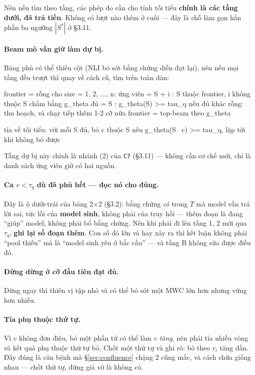 \documentclass[11pt,a4paper]{article}
\begin{document}
Nên nếu tìm theo tầng, các phép đo cần cho tính tối tiểu \textbf{chính là các tầng dưới, đã
trả tiền}. Không có lượt nào thêm ở cuối --- đây là chỗ làm gọn hẳn phần ba ngưỡng $|S^*|$ ở
\S3.11.

\paragraph{Beam mò vẫn giữ làm dự bị.} Bảng phủ có thể thiếu cột (NLI bỏ sót bằng chứng diễn
đạt lại), nên nếu mọi tầng đều trượt thì quay về cách cũ, tìm trên toàn dàn:

\begin{dia}
frontier = { rỗng }
cho size = 1, 2, ..., n:
    ứng viên = { S + {i} : S thuộc frontier, i không thuộc S }
    chấm bằng g_theta
    đủ = { S : g_theta(S) >= tau_q }
    nếu đủ khác rỗng:  thu hoạch, và chạy tiếp thêm 1-2 cỡ nữa
    frontier = top-beam theo g_theta

tỉa về tối tiểu:  với mỗi S đủ, bỏ c thuộc S nếu g_theta(S \ {c}) >= tau_q,
                  lặp tới khi không bỏ được
\end{dia}

Tầng dự bị này chính là nhánh (2) của \texttt{C7} (\S3.11) --- không cần cơ chế mới, chỉ là
danh sách ứng viên giờ có hai nguồn.

\paragraph{Ca $v<\tau_q$ dù đã phủ hết --- đọc nó cho đúng.} Đây là ô dưới-trái của bảng
2$\times$2 (\S3.2): bằng chứng \emph{có} trong $T$ mà model vẫn trả lời sai, tức lỗi của
\textbf{model sinh}, không phải của truy hồi --- thêm đoạn là đang ``giúp'' model, không phải
bổ bằng chứng. Nên khi phải đi lên tầng 1, 2 mới qua $\tau_q$, \textbf{ghi lại số đoạn thêm}.
Con số đó lớn và hay xảy ra thì kết luận không phải ``pool thiếu'' mà là ``model sinh yếu ở
bắc cầu'' --- và tầng B không sửa được điều đó.

\paragraph{Đừng dừng ở cỡ đầu tiên đạt đủ.} Dừng ngay thì thiên vị tập nhỏ và có thể bỏ sót
một MWC lớn hơn nhưng vững hơn nhiều.

\paragraph{Tỉa phụ thuộc thứ tự.} Vì $v$ không đơn điệu, bỏ một phần tử có thể làm $v$
\emph{tăng}, nên phải tỉa nhiều vòng và kết quả phụ thuộc thứ tự bỏ. Chốt một thứ tự và ghi
rõ: bỏ theo $r_i$ tăng dần. Đây đúng là căn bệnh mà \S\ref{sec:confluence} chặng 2 cũng mắc,
và cách chữa giống nhau --- chốt thứ tự, đừng giả vờ là không có.
\end{document}
